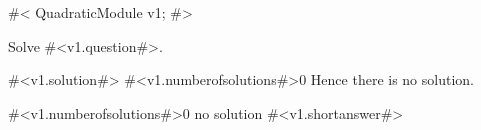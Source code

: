 

#<
QuadraticModule v1;
#>

Solve \hspace{3mm} #<v1.question#>.

#<v1.solution#>
\if #<v1.numberofsolutions#>0
Hence there is no solution.
\fi

\if #<v1.numberofsolutions#>0
no solution
\else
#<v1.shortanswer#>
\fi


